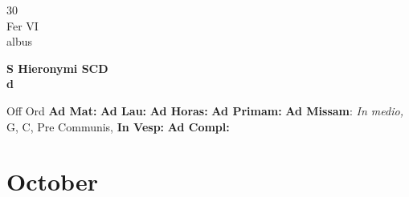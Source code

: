 \documentclass[10pt, openany]{book}
\begin{document}
        \begin{center}
            \begin{minipage}{3.5in}
                \vspace{2em}
                \begin{minipage}{0.5in}
                    {\Huge 30} \\
                    {\normalsize Fer VI} \\
                    {\normalsize albus}
                \end{minipage}
                \begin{minipage}{3.0in}
                    \textbf{ \large S Hieronymi SCD \\
                    \textnormal{\normalsize d}} \\ 
                \end{minipage}
                \begin{justify}Off Ord
                    \textbf{Ad Mat: }
                    \textbf{Ad Lau: }
                    \textbf{Ad Horas: }
                    \textbf{Ad Primam: }\textbf{Ad Missam}: \textit{In medio,} G, C, Pre Communis,  
                    \textbf{In Vesp: }
                    \textbf{Ad Compl: }
                \end{justify}
            \end{minipage}
        \end{center}
    
        \chapter{October}
                        
\end{document}
